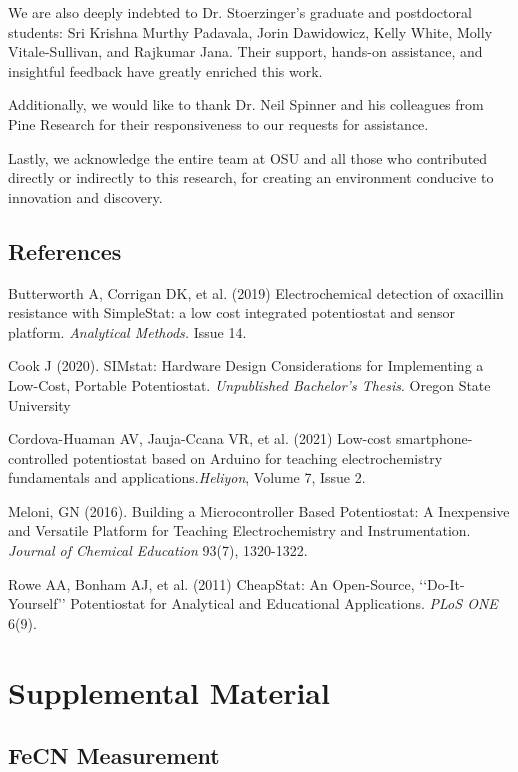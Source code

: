 \documentclass{article}
\begin{document}
We are also deeply indebted to Dr. Stoerzinger's graduate and postdoctoral students: Sri Krishna Murthy Padavala, Jorin Dawidowicz, Kelly White, Molly Vitale-Sullivan, and Rajkumar Jana. Their support, hands-on assistance, and insightful feedback have greatly enriched this work.

Additionally, we would like to thank Dr. Neil Spinner and his colleagues from Pine Research for their responsiveness to our requests for assistance. 

Lastly, we acknowledge the entire team at OSU and all those who contributed directly or indirectly to this research, for creating an environment conducive to innovation and discovery.

\newpage
\subsection*{References}
Butterworth A, Corrigan DK, et al. (2019) Electrochemical detection of oxacillin resistance with SimpleStat: a low cost integrated potentiostat and sensor platform. \emph{Analytical Methods.} Issue 14.


Cook J (2020). SIMstat: Hardware Design Considerations for Implementing a Low-Cost, Portable Potentiostat. \emph{Unpublished Bachelor's Thesis}. Oregon State University


Cordova-Huaman AV, Jauja-Ccana VR, et al. (2021) Low-cost smartphone-controlled potentiostat based on Arduino for teaching electrochemistry fundamentals and applications.\emph{Heliyon}, Volume 7, Issue 2.


Meloni, GN (2016). Building a Microcontroller Based Potentiostat: A Inexpensive and Versatile Platform for Teaching Electrochemistry and Instrumentation. \emph{Journal of Chemical Education} 93(7), 1320-1322.


Rowe AA, Bonham AJ, et al. (2011) CheapStat: An Open-Source, ‘‘Do-It-Yourself’’ Potentiostat for Analytical and Educational Applications. \emph{PLoS ONE} 6(9).


\newpage
\section*{Supplemental Material}
\subsection*{FeCN Measurement}
\end{document}
